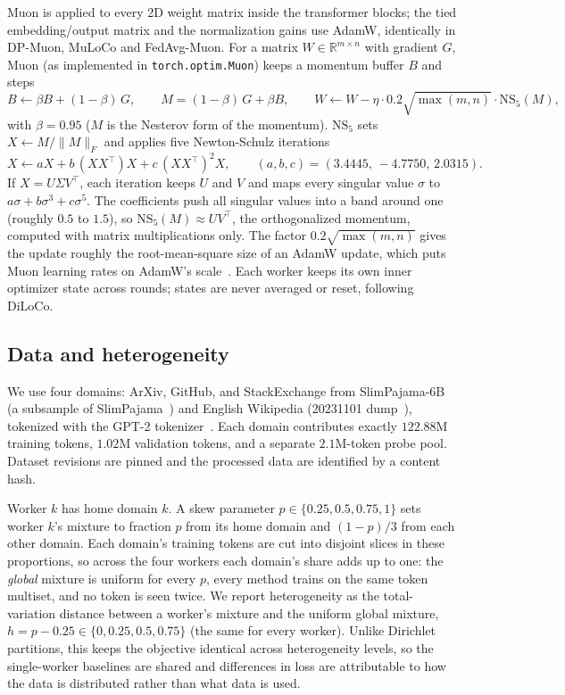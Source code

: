 \documentclass{article}
\newcommand{\R}{\mathbb{R}}
\begin{document}
Muon is applied to every 2D weight matrix inside the transformer blocks; the tied embedding/output matrix and the normalization gains use AdamW, identically in DP-Muon, MuLoCo and FedAvg-Muon. For a matrix $W \in \R^{m\times n}$ with gradient $G$, Muon (as implemented in \texttt{torch.optim.Muon}) keeps a momentum buffer $B$ and steps
\begin{equation}
  B \leftarrow \beta B + (1-\beta)\,G, \qquad M = (1-\beta)\,G + \beta B, \qquad W \leftarrow W - \eta \cdot 0.2\sqrt{\max(m,n)} \cdot \mathrm{NS}_5(M),
\end{equation}
with $\beta = 0.95$ ($M$ is the Nesterov form of the momentum). $\mathrm{NS}_5$ sets $X \leftarrow M / \lVert M \rVert_F$ and applies five Newton-Schulz iterations
\begin{equation}
  X \leftarrow aX + b\,(XX^\top)X + c\,(XX^\top)^2 X, \qquad (a, b, c) = (3.4445,\, -4.7750,\, 2.0315).
\end{equation}
If $X = U\Sigma V^\top$, each iteration keeps $U$ and $V$ and maps every singular value $\sigma$ to $a\sigma + b\sigma^3 + c\sigma^5$. The coefficients push all singular values into a band around one (roughly $0.5$ to $1.5$), so $\mathrm{NS}_5(M) \approx UV^\top$, the orthogonalized momentum, computed with matrix multiplications only. The factor $0.2\sqrt{\max(m,n)}$ gives the update roughly the root-mean-square size of an AdamW update, which puts Muon learning rates on AdamW's scale~\cite{liu2025muonscalable}. Each worker keeps its own inner optimizer state across rounds; states are never averaged or reset, following DiLoCo.

\subsection{Data and heterogeneity}\label{sec:data}
We use four domains: ArXiv, GitHub, and StackExchange from SlimPajama-6B (a subsample of SlimPajama~\cite{cerebras2023slimpajama}) and English Wikipedia (20231101 dump~\cite{wikimedia2023wikipedia}), tokenized with the GPT-2 tokenizer~\cite{radford2019gpt2}. Each domain contributes exactly $122.88$M training tokens, $1.02$M validation tokens, and a separate $2.1$M-token probe pool. Dataset revisions are pinned and the processed data are identified by a content hash.

Worker $k$ has home domain $k$. A skew parameter $p \in \{0.25, 0.5, 0.75, 1\}$ sets worker $k$'s mixture to fraction $p$ from its home domain and $(1-p)/3$ from each other domain. Each domain's training tokens are cut into disjoint slices in these proportions, so across the four workers each domain's share adds up to one: the \emph{global} mixture is uniform for every $p$, every method trains on the same token multiset, and no token is seen twice. We report heterogeneity as the total-variation distance between a worker's mixture and the uniform global mixture, $h = p - 0.25 \in \{0, 0.25, 0.5, 0.75\}$ (the same for every worker). Unlike Dirichlet partitions, this keeps the objective identical across
heterogeneity levels, so the single-worker baselines are shared and differences in loss are attributable to how the data is distributed rather than what data is used.
\end{document}
